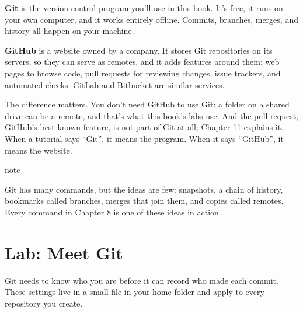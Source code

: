 \textbf{Git} is the version control program you'll use in this book. It's free, it runs on your own computer, and it works entirely offline. Commits, branches, merges, and history all happen on your machine.

\textbf{GitHub} is a website owned by a company. It stores Git repositories on its servers, so they can serve as remotes, and it adds features around them: web pages to browse code, pull requests for reviewing changes, issue trackers, and automated checks. GitLab and Bitbucket are similar services.

The difference matters. You don't need GitHub to use Git: a folder on a shared drive can be a remote, and that's what this book's labs use. And the pull request, GitHub's best-known feature, is not part of Git at all; Chapter 11 explains it. When a tutorial says ``Git'', it means the program. When it says ``GitHub'', it means the website.

\begin{callout}{note}

Git has many commands, but the ideas are few: snapshots, a chain of history, bookmarks called branches, merges that join them, and copies called remotes. Every command in Chapter 8 is one of these ideas in action.

\end{callout}

\section{Lab: Meet Git}\label{04-why-code-needs-a-history:lab-meet-git}

Git needs to know who you are before it can record who made each commit. These settings live in a small file in your home folder and apply to every repository you create.

